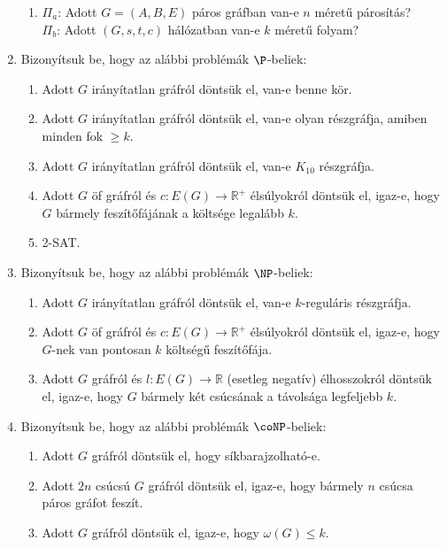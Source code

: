 \documentclass[a4paper, 12pt]{article}
\begin{document}
\begin{enumerate}
\begin{enumerate}
                \item $\Pi_a$: Adott $G=(A,B,E)$ páros gráfban van-e $n$ méretű párosítás? \\
                $\Pi_b$: Adott $(G, s, t, c)$ hálózatban van-e $k$ méretű folyam?
            \end{enumerate}
            \item Bizonyítsuk be, hogy az alábbi problémák $\P$-beliek:
            \begin{enumerate}
                \item Adott $G$ irányítatlan gráfról döntsük el, van-e benne kör.
                \item Adott $G$ irányítatlan gráfról döntsük el, van-e olyan részgráfja, amiben minden fok $\geq k$.
                \item Adott $G$ irányítatlan gráfról döntsük el, van-e $K_{10}$ részgráfja.
                \item Adott $G$ öf gráfról és $c:E(G)\rightarrow \mathbb{R}^{+}$ élsúlyokról döntsük el, igaz-e, hogy $G$ bármely feszítőfájának a költsége legalább $k$.
                \item 2-SAT.
            \end{enumerate}
            \item Bizonyítsuk be, hogy az alábbi problémák $\NP$-beliek:
            \begin{enumerate}
                \item Adott $G$ irányítatlan gráfról döntsük el, van-e $k$-reguláris részgráfja.
                \item Adott $G$ öf gráfról és $c:E(G)\rightarrow\mathbb{R}^{+}$ élsúlyokról döntsük el, igaz-e, hogy $G$-nek van pontosan $k$ költségű feszítőfája.
                \item Adott $G$ gráfról és $l:E(G)\rightarrow\mathbb{R}$ (esetleg negatív) élhosszokról döntsük el, igaz-e, hogy $G$ bármely két csúcsának a távolsága legfeljebb $k$.
            \end{enumerate}
            \item Bizonyítsuk be, hogy az alábbi problémák $\coNP$-beliek:
            \begin{enumerate}
                \item Adott $G$ gráfról döntsük el, hogy síkbarajzolható-e.
                \item Adott $2n$ csúcsú $G$ gráfról döntsük el, igaz-e, hogy bármely $n$ csúcsa páros gráfot feszít.
                \item Adott $G$ gráfról döntsük el, igaz-e, hogy $\omega(G)\leq k$.

\end{enumerate}
\end{enumerate}
\end{document}

